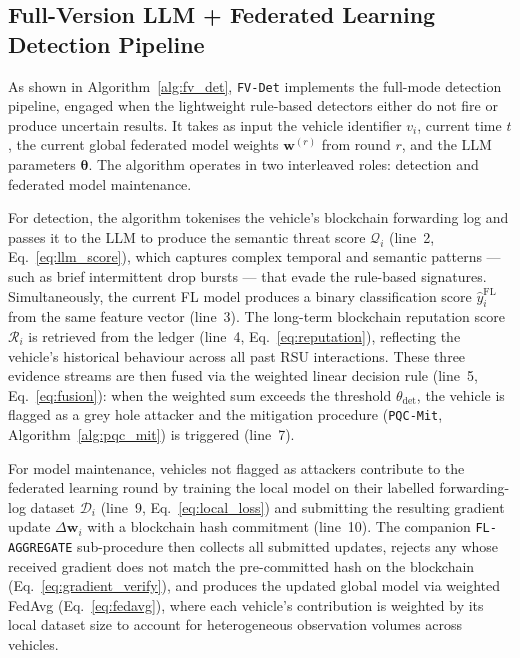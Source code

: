 \documentclass[12pt, a4paper]{report}
\begin{document}
\subsection{Full-Version LLM + Federated Learning Detection Pipeline}

As shown in Algorithm~\ref{alg:fv_det}, 
\texttt{FV-Det} implements the full-mode detection pipeline, 
engaged when the lightweight rule-based detectors either do not 
fire or produce uncertain results. It takes as input the vehicle
identifier $v_i$, current time $t$, the current global federated model weights
$\mathbf{w}^{(r)}$ from round $r$, and the LLM parameters $\boldsymbol{\theta}$.
The algorithm operates in two interleaved roles: detection and federated model
maintenance.

For detection, the algorithm tokenises the vehicle's blockchain forwarding log
and passes it to the LLM to produce the semantic threat score $\mathcal{Q}_i$
(line~2, Eq.~\eqref{eq:llm_score}), which captures complex temporal and
semantic patterns — such as brief intermittent drop bursts — that evade the
rule-based signatures. Simultaneously, the current FL model produces a binary
classification score $\hat{y}_i^{\text{FL}}$ from the same feature vector
(line~3). The long-term blockchain reputation score $\mathcal{R}_i$ is
retrieved from the ledger (line~4, Eq.~\eqref{eq:reputation}), reflecting the
vehicle's historical behaviour across all past RSU interactions. These three
evidence streams are then fused via the weighted linear decision rule
(line~5, Eq.~\eqref{eq:fusion}): when the weighted sum exceeds the threshold
$\theta_{\text{det}}$, the vehicle is flagged as a grey hole attacker and the
mitigation procedure (\texttt{PQC-Mit}, Algorithm~\ref{alg:pqc_mit}) is
triggered (line~7).

For model maintenance, vehicles not flagged as attackers contribute to the
federated learning round by training the local model on their labelled
forwarding-log dataset $\mathcal{D}_i$ (line~9, Eq.~\eqref{eq:local_loss})
and submitting the resulting gradient update $\Delta\mathbf{w}_i$ with a
blockchain hash commitment (line~10). The companion \texttt{FL-AGGREGATE}
sub-procedure then collects all submitted updates, rejects any whose received
gradient does not match the pre-committed hash on the blockchain
(Eq.~\eqref{eq:gradient_verify}), and produces the updated global model via
weighted FedAvg (Eq.~\eqref{eq:fedavg}), where each vehicle's contribution is
weighted by its local dataset size to account for heterogeneous observation
volumes across vehicles.
\end{document}
